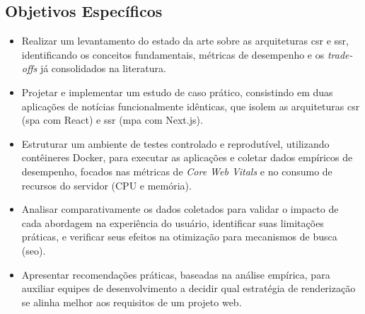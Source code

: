 \subsection{Objetivos Específicos}
\begin{itemize}
    \item Realizar um levantamento do estado da arte sobre as arquiteturas \acrshort{csr} e \acrshort{ssr}, identificando os conceitos fundamentais, métricas de desempenho e os \textit{trade-offs} já consolidados na literatura.

    \item Projetar e implementar um estudo de caso prático, consistindo em duas aplicações de notícias funcionalmente idênticas, que isolem as arquiteturas \acrshort{csr} (\acrshort{spa} com React) e \acrshort{ssr} (\acrshort{mpa} com Next.js).

    \item Estruturar um ambiente de testes controlado e reprodutível, utilizando contêineres Docker, para executar as aplicações e coletar dados empíricos de desempenho, focados nas métricas de \textit{Core Web Vitals} e no consumo de recursos do servidor (CPU e memória).
    
    \item Analisar comparativamente os dados coletados para validar o impacto de cada abordagem na experiência do usuário, identificar suas limitações práticas, e verificar seus efeitos na otimização para mecanismos de busca (\acrshort{seo}).
    
    \item Apresentar recomendações práticas, baseadas na análise empírica, para auxiliar equipes de desenvolvimento a decidir qual estratégia de renderização se alinha melhor aos requisitos de um projeto web.
\end{itemize}




